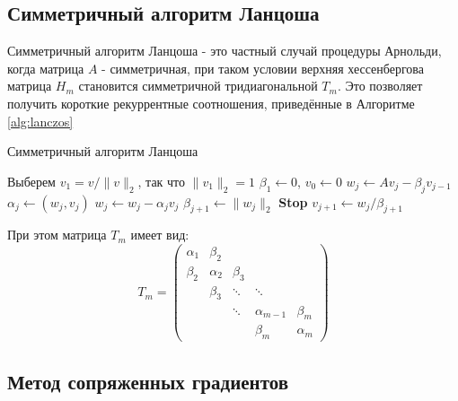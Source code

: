 \subsection[Симметричный алгоритм Ланцоша]{Симметричный алгоритм Ланцоша }

Симметричный алгоритм Ланцоша \cite{Saad2003} - это частный случай процедуры Арнольди, когда матрица 
$A$ - симметричная, при таком условии верхняя хессенбергова матрица $H_m$ становится симметричной
тридиагональной $T_m$. Это позволяет получить короткие рекуррентные соотношения, 
приведённые в Алгоритме \ref{alg:lanczos} 
\begin{algorithm}[H]
    \caption{Симметричный алгоритм Ланцоша}\label{alg:lanczos}
    \begin{algorithmic}[1]
    \State Выберем $v_1 = v / \|v\|_2$, так что $\|v_1\|_2 = 1$
    \State $\beta_1 \gets 0$, $v_0 \gets 0$
        \State $w_j \gets Av_j - \beta_j v_{j-1}$
        \State $\alpha_j \gets (w_j, v_j)$
        \State $w_j \gets w_j - \alpha_j v_j$
        \State $\beta_{j+1} \gets \|w_j\|_2$
            \State \textbf{Stop}
        \EndIf
        \State $v_{j+1} \gets w_j / \beta_{j+1}$
    \EndFor
    \end{algorithmic}
    \end{algorithm} 

При этом матрица $T_m$ имеет вид: 
\begin{equation}
T_m = \begin{pmatrix}
\alpha_1 & \beta_2 & & & \\
\beta_2 & \alpha_2 & \beta_3 & & \\
& \beta_3 & \ddots & \ddots & \\
& & \ddots & \alpha_{m-1} & \beta_m \\
& & & \beta_m & \alpha_m
\end{pmatrix}
\label{eq:T_m}
\end{equation}

\subsection[Метод сопряженных градиентов]{Метод сопряженных градиентов}


